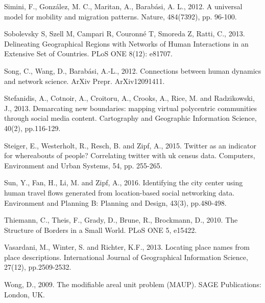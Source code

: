 \documentclass[]{tGIS2e}
\begin{document}
\begin{thebibliography}{9}
Simini, F., González, M. C., Maritan, A., Barabási, A. L., 2012. A universal model for mobility and migration patterns. Nature, 484(7392), pp. 96-100.

Sobolevsky S, Szell M, Campari R, Couronné T, Smoreda Z, Ratti, C., 2013. Delineating Geographical Regions with Networks of Human Interactions in an Extensive Set of Countries. PLoS ONE 8(12): e81707.

Song, C., Wang, D., Barabási, A.-L., 2012. Connections between human dynamics and network science. ArXiv Prepr. ArXiv12091411.

Stefanidis, A., Cotnoir, A., Croitoru, A., Crooks, A., Rice, M. and Radzikowski, J., 2013. Demarcating new boundaries: mapping virtual polycentric communities through social media content. Cartography and Geographic Information Science, 40(2), pp.116-129.

Steiger, E., Westerholt, R., Resch, B. and Zipf, A., 2015. Twitter as an indicator for whereabouts of people? Correlating twitter with uk census data. Computers, Environment and Urban Systems, 54, pp. 255-265.

Sun, Y., Fan, H., Li, M. and Zipf, A., 2016. Identifying the city center using human travel flows generated from location-based social networking data. Environment and Planning B: Planning and Design, 43(3), pp.480-498.

Thiemann, C., Theis, F., Grady, D., Brune, R., Brockmann, D., 2010. The Structure of Borders in a Small World. PLoS ONE 5, e15422.

Vasardani, M., Winter, S. and Richter, K.F., 2013. Locating place names from place descriptions. International Journal of Geographical Information Science, 27(12), pp.2509-2532.

Wong, D., 2009. The modifiable areal unit problem (MAUP). SAGE Publications: London, UK.


\end{thebibliography}
\end{document}
